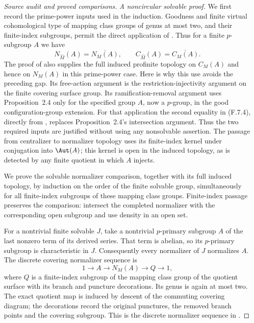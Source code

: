 \begin{proof}[Source audit and proved comparisons]
\emph{A noncircular solvable proof.}
We first record the prime-power inputs used in the
induction. Goodness and finite virtual cohomological
type of mapping class groups of genus at most two,
and their finite-index subgroups, permit the direct
application of \cite[Theorem~A]{R-BZ}. Thus for a
finite $p$-subgroup $A$ we have
\[
 N_{\widehat M}(A)=\overline{N_M(A)},\qquad
 C_{\widehat M}(A)=\overline{C_M(A)}.                   \tag{F.7.4}
\]
The proof of \cite[Theorem~A and Corollary~B]{R-Boggi}
also supplies the full induced profinite topology on
$C_M(A)$ and hence on $N_M(A)$ in this prime-power case.
Here is why this use avoids the preceding gap. Its
free-action argument is the restriction-injectivity
argument on the finite covering surface group. Its
ramification-removal argument uses Proposition~2.4
only for the specified group $A$, now a $p$-group,
in the good configuration-group extension. For that
application the second equality in (F.7.4), directly
from \cite[Theorem~A]{R-BZ}, replaces Proposition~2.4's
intersection argument. Thus the two required inputs
are justified without using any nonsolvable assertion.
The passage from centralizer to normalizer topology
uses its finite-index kernel under conjugation into
$\Aut(A)$; this kernel is open in the induced topology,
as is detected by any finite quotient in which $A$
injects.

We prove the solvable normalizer comparison, together
with its full induced topology, by induction on the
order of the finite solvable group, simultaneously for
all finite-index subgroups of these mapping class
groups. Finite-index passage preserves the comparison:
intersect the completed normalizer with the corresponding
open subgroup and use density in an open set.

For a nontrivial finite solvable $J$, take a nontrivial
$p$-primary subgroup $A$ of the last nonzero term of
its derived series. That term is abelian, so its
$p$-primary subgroup is characteristic in $J$.
Consequently every normalizer of $J$ normalizes $A$.
The discrete covering normalizer sequence is
\[
 1\longrightarrow A\longrightarrow N_M(A)
                 \longrightarrow Q\longrightarrow1,   \tag{F.7.5}
\]
where $Q$ is a finite-index subgroup of the mapping
class group of the quotient surface with its branch
and puncture decorations. Its genus is again at most
two. The exact quotient map is induced by descent of
the commuting covering diagram; the decorations
record the original punctures, the removed branch
points and the covering subgroup. This is the discrete
normalizer sequence in \cite[\S2.1]{R-Boggi}.


\end{proof}
